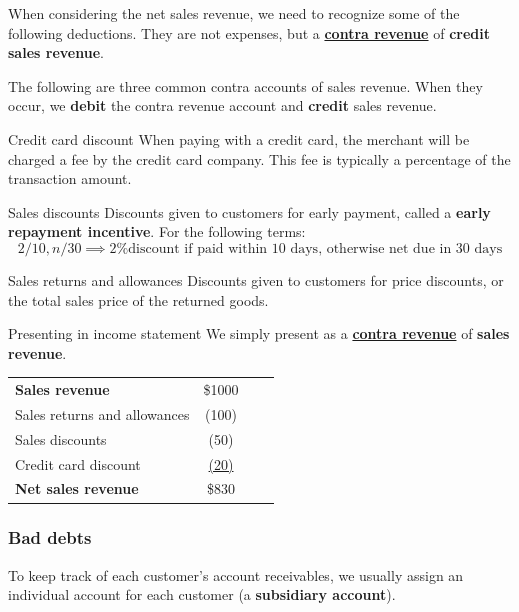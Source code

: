 When considering the net sales revenue, we need to recognize some of the following deductions. They are not expenses, but a \hyperref[def:contra]{\textbf{contra revenue}} of \textbf{credit sales revenue}.

The following are three common contra accounts of sales revenue. When they occur, we \textbf{debit} the contra revenue account and \textbf{credit} sales revenue.

\begin{theorem}
    {Credit card discount}
    When paying with a credit card, the merchant will be charged a fee by the credit card company. This fee is typically a percentage of the transaction amount.
\end{theorem}

\begin{theorem}
    {Sales discounts}
    Discounts given to customers for early payment, called a \textbf{early repayment incentive}. For the following terms:
    \[2/10, n/30 \implies \text{2\% discount if paid within 10 days, otherwise net due in 30 days}\]
\end{theorem}

\begin{theorem}
    {Sales returns and allowances}
    Discounts given to customers for price discounts, or the total sales price of the returned goods.
\end{theorem}

\begin{knBox}
    {Presenting in income statement}
    We simply present as a \hyperref[def:contra]{\textbf{contra revenue}} of \textbf{sales revenue}.

    \begin{tabular}{lccc}
        \textbf{Sales revenue} & \$1000 \\
        \quad Sales returns and allowances & (100) \\
        \quad Sales discounts & (50) \\
        \quad Credit card discount & \underline{(20)} \\
        \textbf{Net sales revenue} & \$830 \\
    \end{tabular}
\end{knBox}

\subsubsection{Bad debts}

To keep track of each customer's account receivables, we usually assign an individual account for each customer (a \textbf{subsidiary account}).

